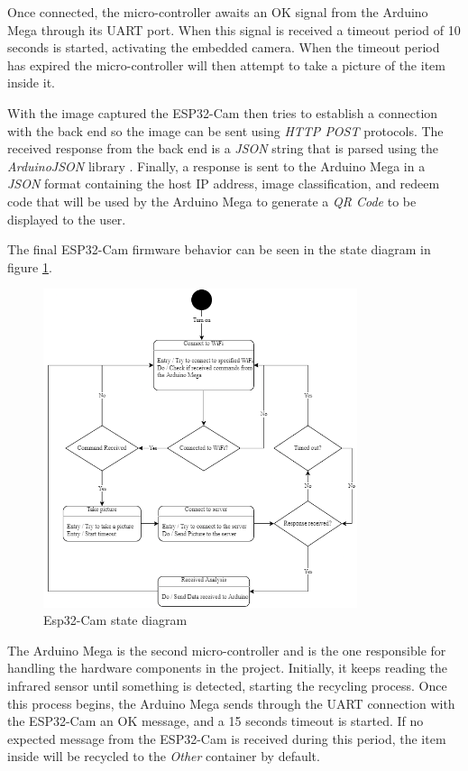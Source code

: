 \documentclass[a4paper,11pt]{article}
\begin{document}
Once connected, the micro-controller awaits an OK signal from the Arduino Mega through its UART port. When this signal is received a timeout period of 10 seconds is started, activating the embedded camera. When the timeout period has expired the micro-controller will then attempt to take a picture of the item inside it.

With the image captured the ESP32-Cam then tries to establish a connection with the back end so the image can be sent using \textit{HTTP POST} protocols. The received response from the back end is a \textit{JSON} string that is parsed using the \textit{ArduinoJSON} library \cite{ArduinoJson}. Finally, a response is sent to the Arduino Mega in a \textit{JSON} format containing the host IP address, image classification, and redeem code that will be used by the Arduino Mega to generate a \textit{QR Code} to be displayed to the user.

The final ESP32-Cam firmware behavior can be seen in the state diagram in figure \ref{fig:espState}.

\begin{figure}[H]
  \centering
  \includegraphics[width=9.2cm]{Figures/State Chart Esp32.png}
  \caption{\small{Esp32-Cam state diagram}}
  \label{fig:espState}
\end{figure}

The Arduino Mega is the second micro-controller and is the one responsible for handling the hardware components in the project. Initially, it keeps reading the infrared sensor until something is detected, starting the recycling process. Once this process begins, the Arduino Mega sends through the UART connection with the ESP32-Cam an OK message, and a 15 seconds timeout is started. If no expected message from the ESP32-Cam is received during this period, the item inside will be recycled to the \textit{Other} container by default.
\end{document}
